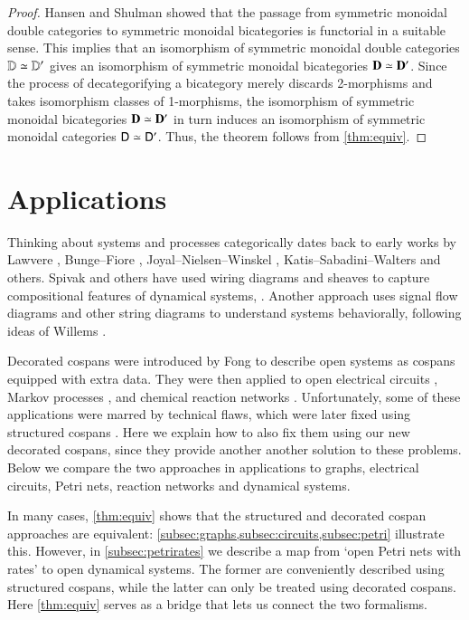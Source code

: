 \documentclass[reqno]{amsart}
\begin{document}
\begin{proof} 
Hansen and Shulman \cite{HS} showed that the passage from symmetric monoidal double categories to symmetric monoidal bicategories is functorial in a suitable sense.  This implies that an isomorphism of symmetric monoidal double categories $\mathbf{\mathbb D} \simeq \mathbf{\mathbb D}'$ gives an isomorphism of symmetric monoidal bicategories $\mathbf{D} \simeq \mathbf{D}'$.    Since the process of decategorifying a bicategory merely discards 2-morphisms and takes isomorphism classes of 1-morphisms, the isomorphism of symmetric monoidal bicategories $\mathbf{D} \simeq \mathbf{D}'$ in turn induces an isomorphism of symmetric monoidal categories $\mathsf{D} \simeq \mathsf{D}'$.   Thus, the theorem follows from \cref{thm:equiv}. \end{proof}

\section{Applications}\label{Applications}

Thinking about systems and processes categorically dates back to early works by Lawvere \cite{Lawvere}, Bunge--Fiore \cite{BungeFiore}, Joyal--Nielsen--Winskel \cite{JNW}, Katis--Sabadini--Walters \cite{KSW} and others.   Spivak and others have used wiring diagrams and sheaves to capture compositional features of dynamical systems, \cite{BFV,SSV,VSL}.  Another approach uses signal flow diagrams and other string diagrams \cite{BE,BSZ,FRS} to understand systems behaviorally, following ideas of Willems \cite{Willems}.  
 
Decorated cospans were introduced by Fong \cite{Fong,FongThesis} to describe open systems as cospans equipped with extra data.  They were then applied to open electrical circuits \cite{BF}, Markov processes \cite{BFP}, and chemical reaction networks \cite{BP}.  Unfortunately, some of these applications were marred by technical flaws, which were later fixed using structured cospans \cite{BC}. Here we explain how to also fix them using our new decorated cospans, since they provide another another solution to these problems. Below we compare the two approaches in applications to graphs, electrical circuits, Petri nets, reaction networks and dynamical systems. 

In many cases, \cref{thm:equiv} shows that the structured and decorated cospan approaches are equivalent: \cref{subsec:graphs,subsec:circuits,subsec:petri} illustrate this.   However, in \cref{subsec:petrirates} we describe a map from `open Petri nets with rates' to open dynamical systems.  The former are conveniently described using structured cospans, while the latter can only be treated using decorated cospans.   Here \cref{thm:equiv} serves as a bridge that lets us connect the two formalisms.
\end{document}
